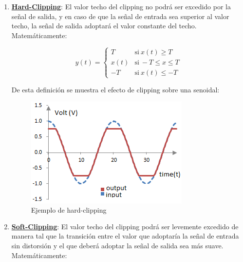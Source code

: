 \documentclass[../../main.tex]{subfiles}
\begin{document}
\begin{enumerate}

\item \underline{\textbf{Hard-Clipping}}: El valor techo del clipping no podrá ser excedido por la señal de salida, y en caso de que la señal de entrada sea superior al valor techo, la señal de salida adoptará el valor constante del techo. Matemáticamente: \par
	 \begin{equation}
    	 \label{eq:aqui-le-mostramos-como-hacerle-la-llave-grande}
  	   y(t) = \left\{
	  	    \begin{array}{ll}
		 					T      & \mathrm{si\ } x(t) \ge T \\
			 				x(t) & \mathrm{si\ } -T \le x \le T \\
			 				-T     & \mathrm{si\ } x(t) \le -T
	     	 \end{array}
	     	\right.
 	\end{equation}
\par
De esta definición se muestra el efecto de clipping sobre una senoidal:

\begin{figure}[H]	%
	\centering
	\includegraphics[scale=1]{imagenes/hard_clipping_grafico_tipico.png}
	\caption{Ejemplo de hard-clipping}
	\label{fig:ej5_hard_clipping_grafico_tipico}
\end{figure}

\item \underline{\textbf{Soft-Clipping}}: El valor techo del clipping podrá ser levemente excedido de manera tal que la transición entre el valor que adoptaría la señal de entrada sin distorsión y el que deberá adoptar la señal de salida sea más suave. Matemáticamente: \par


\end{enumerate}
\end{document}
